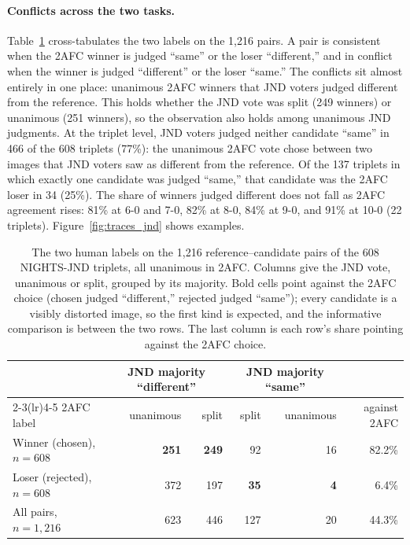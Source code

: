 \paragraph{Conflicts across the two tasks.} Table~\ref{tab:disagree} cross-tabulates the two labels on the 1{,}216 pairs. A pair is consistent when the 2AFC winner is judged ``same'' or the loser ``different,'' and in conflict when the winner is judged ``different'' or the loser ``same.'' The conflicts sit almost entirely in one place: unanimous 2AFC winners that JND voters judged different from the reference. This holds whether the JND vote was split (249 winners) or unanimous (251 winners), so the observation also holds among unanimous JND judgments. At the triplet level, JND voters judged neither candidate ``same'' in 466 of the 608 triplets (77\%): the unanimous 2AFC vote chose between two images that JND voters saw as different from the reference. Of the 137 triplets in which exactly one candidate was judged ``same,'' that candidate was the 2AFC loser in 34 (25\%). The share of winners judged different does not fall as 2AFC agreement rises: 81\% at 6-0 and 7-0, 82\% at 8-0, 84\% at 9-0, and 91\% at 10-0 (22 triplets). Figure~\ref{fig:traces_jnd} shows examples.

\begin{table}[ht]
\caption{The two human labels on the 1{,}216 reference--candidate pairs of the 608 NIGHTS-JND triplets, all unanimous in 2AFC. Columns give the JND vote, unanimous or split, grouped by its majority. Bold cells point against the 2AFC choice (chosen judged ``different,'' rejected judged ``same''); every candidate is a visibly distorted image, so the first kind is expected, and the informative comparison is between the two rows. The last column is each row's share pointing against the 2AFC choice.}
\label{tab:disagree}
\centering
\small
\begin{tabular}{lrrrrr}
\toprule
 & \multicolumn{2}{c}{JND majority ``different''} & \multicolumn{2}{c}{JND majority ``same''} & \\
\cmidrule(lr){2-3}\cmidrule(lr){4-5}
2AFC label & unanimous & split & split & unanimous & against 2AFC \\
\midrule
Winner (chosen), $n=608$ & \textbf{251} & \textbf{249} & 92 & 16 & 82.2\% \\
Loser (rejected), $n=608$ & 372 & 197 & \textbf{35} & \textbf{4} & 6.4\% \\
\midrule
All pairs, $n=1{,}216$ & 623 & 446 & 127 & 20 & 44.3\% \\
\bottomrule
\end{tabular}
\end{table}

